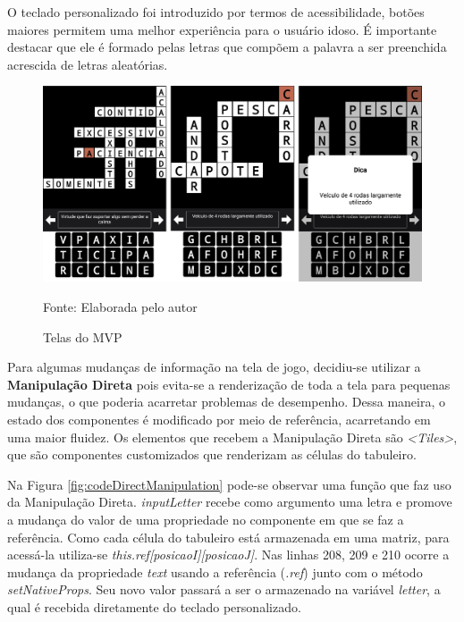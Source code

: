 O teclado personalizado foi introduzido por termos de acessibilidade, botões maiores permitem uma melhor experiência para o usuário idoso. É importante destacar que ele é formado pelas letras que compõem a palavra a ser preenchida acrescida de letras aleatórias.

\begin{figure}[H]
\centering
    \caption{Telas do MVP}
    \label{fig:mvp}
    \includegraphics[width=1.0\textwidth]{Figuras/mvp.png}
    
    Fonte: Elaborada pelo autor
\end{figure}

Para algumas mudanças de informação na tela de jogo, decidiu-se utilizar a \textbf{Manipulação Direta} pois evita-se a renderização de toda a tela para pequenas mudanças, o que poderia acarretar problemas de desempenho. Dessa maneira, o estado dos componentes é modificado por meio de referência, acarretando em uma maior fluidez. Os elementos que recebem a Manipulação Direta são \textit{<Tiles>}, que são componentes customizados que renderizam as células do tabuleiro. 

Na Figura \ref{fig:codeDirectManipulation} pode-se observar uma função que faz uso da Manipulação Direta. \textit{inputLetter} recebe como argumento uma letra e promove a mudança do valor de uma propriedade no componente em que se faz a referência. Como cada célula do tabuleiro está armazenada em uma matriz, para acessá-la utiliza-se \textit{this.ref[posicaoI][posicaoJ]}. Nas linhas 208, 209 e 210 ocorre a mudança da propriedade \textit{text} usando a referência (\textit{.ref}) junto com o método \textit{setNativeProps}. Seu novo valor passará a ser o armazenado na variável \textit{letter}, a qual é recebida diretamente do teclado personalizado.

